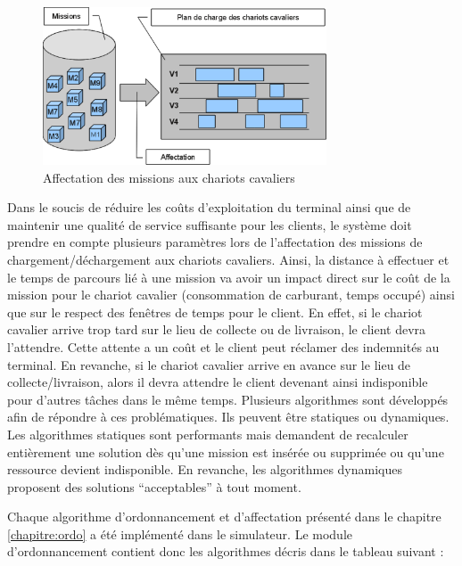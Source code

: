 \begin{figure}[h]
\centering
\includegraphics[width=0.75\textwidth]{chapitres/simulation/ordonnancement.png}
\caption{Affectation des missions aux chariots cavaliers}
 \label{fig:simulation:ordonnancement}
\end{figure}

Dans le soucis de réduire les coûts d'exploitation du terminal ainsi que de maintenir une qualité de service suffisante pour les clients, le système doit prendre en compte plusieurs paramètres lors de l'affectation des missions de chargement/déchargement aux chariots cavaliers. Ainsi, la distance à effectuer et le temps de parcours lié à une mission va avoir un impact direct sur le coût de la mission pour le chariot cavalier (consommation de carburant, temps occupé) ainsi que sur le respect des fenêtres de temps pour le client. En effet, si le chariot cavalier arrive trop tard sur le lieu de collecte ou de livraison, le client devra l'attendre. Cette attente a un coût et le client peut réclamer des indemnités au terminal. En revanche, si le chariot cavalier arrive en avance sur le lieu de collecte/livraison, alors il devra attendre le client devenant ainsi indisponible pour d'autres tâches dans le même temps. Plusieurs algorithmes sont développés afin de répondre à ces problématiques. Ils peuvent être 
statiques ou dynamiques. Les algorithmes statiques sont performants mais demandent de recalculer entièrement une solution dès qu'une mission est insérée ou supprimée ou qu'une ressource devient indisponible. En revanche, les algorithmes dynamiques proposent des solutions ``acceptables'' à tout moment.

Chaque algorithme d'ordonnancement et d'affectation présenté dans le chapitre \ref{chapitre:ordo} a été implémenté dans le simulateur. Le module d'ordonnancement contient donc les algorithmes décris dans le tableau suivant : 

